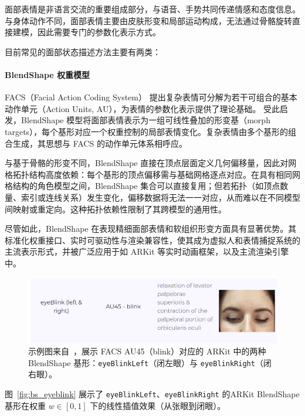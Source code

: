 面部表情是非语言交流的重要组成部分，与语音、手势共同传递情感和态度信息。与身体动作不同，面部表情主要由皮肤形变和局部运动构成，无法通过骨骼旋转直接建模，因此需要专门的参数化表示方式。

目前常见的面部状态描述方法主要有两类：

\paragraph{BlendShape 权重模型}
FACS（Facial Action Coding System）\cite{EkmanFriesenFACS1978} 提出复杂表情可分解为若干可组合的基本动作单元（Action Units, AU），为表情的参数化表示提供了理论基础。
受此启发，BlendShape 模型将面部表情表示为一组可线性叠加的形变基（morph targets），每个基形对应一个权重控制的局部表情变化。复杂表情由多个基形的组合生成，其思想与 FACS 的动作单元体系相呼应。

与基于骨骼的形变不同，BlendShape 直接在顶点层面定义几何偏移量，因此对网格拓扑结构高度依赖：每个基形的顶点偏移需与基础网格逐点对应。在具有相同网格结构的角色模型之间，BlendShape 集合可以直接复用；但若拓扑（如顶点数量、索引或连线关系）发生变化，偏移数据将无法一一对应，从而难以在不同模型间映射或重定向。这种拓扑依赖性限制了其跨模型的通用性。

尽管如此，BlendShape 在表现精细面部表情和软组织形变方面具有显著优势。其标准化权重接口、实时可驱动性与渲染兼容性，使其成为虚拟人和表情捕捉系统的主流表示形式，并被广泛应用于如 ARKit \cite{ARKitDocumentation} 等实时动画框架，以及主流渲染引擎中。

\begin{figure}[h!t]
\centering
\includegraphics[width=0.95\linewidth]{figures/Fig_AUSample.png}
\caption{示例图来自~\cite{ozel_arkit_facs_cheatsheet}，展示 FACS AU45（blink）对应的 ARKit 中的两种 BlendShape 基形：\texttt{eyeBlinkLeft}（闭左眼）与 \texttt{eyeBlinkRight}（闭右眼）。}
\label{fig:au_sample}
\end{figure}

图~\ref{fig:bs_eyeblink} 展示了 \texttt{eyeBlinkLeft}、\texttt{eyeBlinkRight} 的ARKit BlendShape基形在权重 $w\!\in\![0,1]$ 下的线性插值效果（从张眼到闭眼）。

